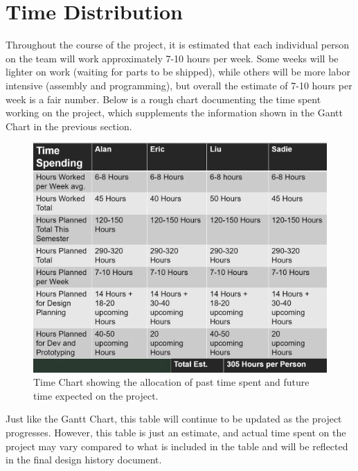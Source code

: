 \documentclass{report}
\begin{document}



\section{Time Distribution}
Throughout the course of the project, it is estimated that each individual person on the team will work approximately 7-10 hours per week. Some weeks will be lighter on work (waiting for parts to be shipped), while others will be more labor intensive (assembly and programming), but overall the estimate of 7-10 hours per week is a fair number. Below is a rough chart documenting the time spent working on the project, which supplements the information shown in the Gantt Chart in the previous section.\\

\begin{figure}[H]
    \centering
    \includegraphics[width=15cm]{PNGs/TimeChart.PNG}
    \caption{Time Chart showing the allocation of past time spent and future time expected  on the project.}
    \label{fig:time_chart}
\end{figure}

Just like the Gantt Chart, this table will continue to be updated as the project progresses. However, this table is just an estimate, and actual time spent on the project may vary compared to what is included in the table and will be reflected in the final design history document.



\end{document}

